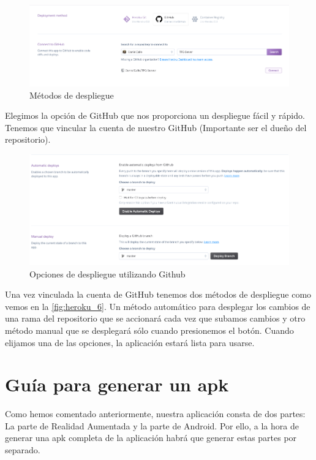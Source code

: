 \begin{figure}[H]
    \centering
    \includegraphics[width=6in]{figures/appendix-A/heroku_5.png}
    \caption{Métodos de despliegue}
    \label{fig:heroku_5}
\end{figure}
Elegimos la opción de GitHub que nos proporciona un despliegue fácil y rápido.
Tenemos que vincular la cuenta de nuestro GitHub (Importante ser el dueño del
 repositorio).
\begin{figure}[H]
    \centering
    \includegraphics[width=6in]{figures/appendix-A/heroku_6.png}
    \caption{Opciones de despliegue utilizando Github}
    \label{fig:heroku_6}
\end{figure}

Una vez vinculada la cuenta de GitHub tenemos dos métodos de despliegue como
 vemos en la \autoref{fig:heroku_6}. Un método automático para desplegar los
 cambios de una rama del repositorio que se accionará cada vez que subamos
 cambios y otro método manual que se desplegará sólo cuando presionemos
 el botón. 
Cuando elijamos una de las opciones, la aplicación estará lista para usarse.

\section{Guía para generar un apk}
Como hemos comentado anteriormente, nuestra aplicación consta de dos partes: La parte de Realidad Aumentada y 
la parte de Android. Por ello, a la hora de generar una apk completa de la aplicación habrá que generar estas partes 
por separado.


